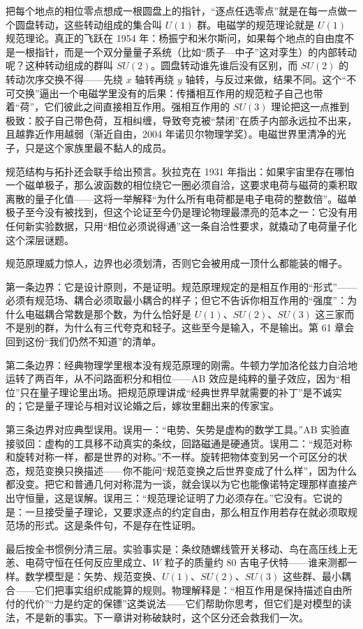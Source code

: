 \begin{challenge}
把每个地点的相位零点想成一根圆盘上的指针，“逐点任选零点”就是在每一点做一个圆盘转动，这些转动组成的集合叫 \(U(1)\) 群。电磁学的规范理论就是 \(U(1)\) 规范理论。真正的飞跃在 1954 年：杨振宁和米尔斯问，如果每个地点的自由度不是一根指针，而是一个双分量量子系统（比如“质子—中子”这对孪生）的内部转动呢？这种转动组成的群叫 \(SU(2)\)。圆盘转动谁先谁后没有区别，而 \(SU(2)\) 的转动次序交换不得——先绕 \(x\) 轴转再绕 \(y\) 轴转，与反过来做，结果不同。这个“不可交换”逼出一个电磁学里没有的后果：传播相互作用的规范粒子自己也带着“荷”，它们彼此之间直接相互作用。强相互作用的 \(SU(3)\) 理论把这一点推到极致：胶子自己带色荷，互相纠缠，导致夸克被“禁闭”在质子内部永远拉不出来，且越靠近作用越弱（渐近自由，2004 年诺贝尔物理学奖）。电磁世界里清净的光子，只是这个家族里最不黏人的成员。

规范结构与拓扑还会联手给出预言。狄拉克在 1931 年指出：如果宇宙里存在哪怕一个磁单极子，那么波函数的相位绕它一圈必须自洽，这要求电荷与磁荷的乘积取离散的量子化值——这将一举解释“为什么所有电荷都是电子电荷的整数倍”。磁单极子至今没有被找到，但这个论证至今仍是理论物理最漂亮的范本之一：它没有用任何新实验数据，只用“相位必须说得通”这一条自洽性要求，就撬动了电荷量子化这个深层谜题。
\end{challenge}


\begin{mainline}
规范原理威力惊人，边界也必须划清，否则它会被用成一顶什么都能装的帽子。

第一条边界：它是设计原则，不是证明。规范原理规定的是相互作用的“形式”——必须有规范场、耦合必须取最小耦合的样子；但它不告诉你相互作用的“强度”：为什么电磁耦合常数是那个数，为什么恰好是 \(U(1)\)、\(SU(2)\)、\(SU(3)\) 这三家而不是别的群，为什么有三代夸克和轻子。这些至今是输入，不是输出。第 61 章会回到这份“我们仍然不知道”的清单。

第二条边界：经典物理学里根本没有规范原理的刚需。牛顿力学加洛伦兹力自洽地运转了两百年，从不问路面积分和相位——AB 效应是纯粹的量子效应，因为“相位”只在量子理论里出场。把规范原理讲成“经典世界早就需要的补丁”是不诚实的；它是量子理论与相对议论婚之后，嫁妆里翻出来的传家宝。

第三条边界对应典型误用。误用一：“电势、矢势是虚构的数学工具。”AB 实验直接驳回：虚构的工具移不动真实的条纹，回路磁通是硬通货。误用二：“规范对称和旋转对称一样，都是世界的对称。”不一样。旋转把物体变到另一个可区分的状态，规范变换只换描述——你不能问“规范变换之后世界变成了什么样”，因为什么都没变。把它和普通几何对称混为一谈，就会误以为它也能像诺特定理那样直接产出守恒量，这是误解。误用三：“规范理论证明了力必须存在。”它没有。它说的是：一旦接受量子理论，又要求逐点的约定自由，那么相互作用若存在就必须取规范场的形式。这是条件句，不是存在性证明。

最后按全书惯例分清三层。实验事实是：条纹随螺线管开关移动、鸟在高压线上无恙、电荷守恒在任何反应里成立、\(W\) 粒子的质量约 80 吉电子伏特——谁来测都一样。数学模型是：矢势、规范变换、\(U(1)\)、\(SU(2)\)、\(SU(3)\) 这些群、最小耦合——它们把事实组织成能算的规则。物理解释是：“相互作用是保持描述自由所付的代价”“力是约定的保镖”这类说法——它们帮助你思考，但它们是对模型的读法，不是新的事实。下一章讲对称破缺时，这个区分还会救我们一次。
\end{mainline}

